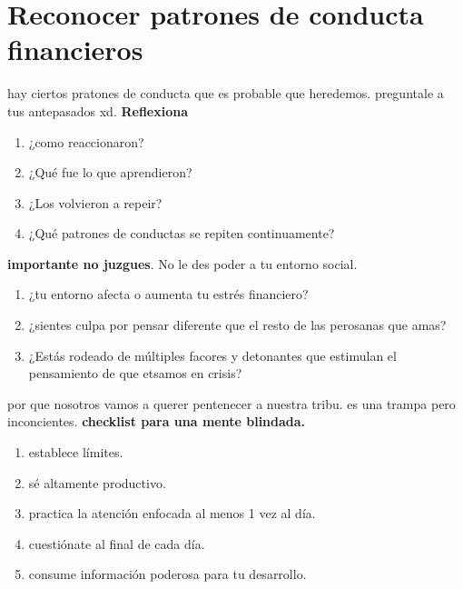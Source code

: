 \documentclass{article}
\begin{document}
\section{Reconocer patrones de conducta financieros}
hay ciertos pratones de conducta que es probable que heredemos.
preguntale a tus antepasados xd.
\textbf{Reflexiona}
\begin{enumerate}
    \item ¿como reaccionaron?
    \item ¿Qué fue lo que aprendieron?
    \item ¿Los volvieron a repeir?
    \item ¿Qué patrones de conductas se repiten continuamente?
\end{enumerate}
\textbf{importante no juzgues}.
No le des poder a tu entorno social.
\begin{enumerate}
    \item ¿tu entorno afecta o aumenta tu estrés financiero?
    \item ¿sientes culpa por pensar diferente que el resto de las perosanas que amas?
    \item ¿Estás rodeado de múltiples facores y detonantes que estimulan el pensamiento de que etsamos en crisis?
\end{enumerate}
por que nosotros vamos a querer pentenecer a nuestra tribu.
es una trampa pero inconcientes.
\textbf{checklist para una mente blindada.} 
\begin{enumerate}
    \item establece límites.
    \item sé altamente productivo.
    \item practica la atención enfocada al menos 1 vez al día. 
    \item cuestiónate al final de cada día.
    \item consume información poderosa para tu desarrollo.
\end{enumerate}
\end{document}
